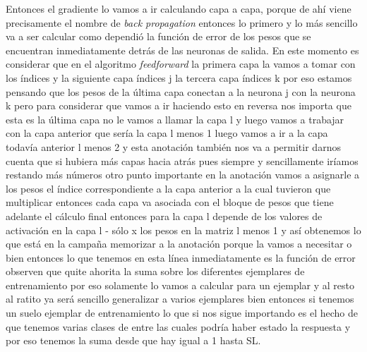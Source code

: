 Entonces el gradiente lo vamos a ir calculando capa a capa, porque de ahí viene precisamente el nombre de \emph{back propagation} entonces lo primero y lo más sencillo va a ser calcular como dependió la función de error de los pesos que se encuentran inmediatamente detrás de las neuronas de salida. En este momento es considerar que en el algoritmo \emph{feedforward} la primera capa la vamos a tomar con los índices y la siguiente capa índices j la tercera capa índices k por eso estamos pensando que los pesos de la última capa conectan a la neurona j con la neurona k pero para considerar que vamos a ir haciendo esto en reversa nos importa que esta es la última capa no le vamos a llamar la capa l y luego vamos a trabajar con la capa anterior que sería la capa l menos 1 luego vamos a ir a la capa todavía anterior l menos 2 y esta anotación también nos va a permitir darnos cuenta que si hubiera más capas hacia atrás pues siempre y sencillamente iríamos restando más números otro punto importante en la anotación vamos a asignarle a los pesos el índice correspondiente a la capa anterior a la cual tuvieron que multiplicar entonces cada capa va asociada con el bloque de pesos que tiene adelante el cálculo final entonces para la capa l depende de los valores de activación en la capa l - sólo x los pesos en la matriz l menos 1 y así obtenemos lo que está en la campaña memorizar a la anotación porque la vamos a necesitar o bien entonces lo que tenemos en esta línea inmediatamente es la función de error observen que quite ahorita la suma sobre los diferentes ejemplares de entrenamiento por eso solamente lo vamos a calcular para un ejemplar y al resto al ratito ya será sencillo generalizar a varios ejemplares bien entonces si tenemos un suelo ejemplar de entrenamiento lo que si nos sigue importando es el hecho de que tenemos varias clases de entre las cuales podría haber estado la respuesta y por eso tenemos la suma desde que hay igual a 1 hasta SL. 
